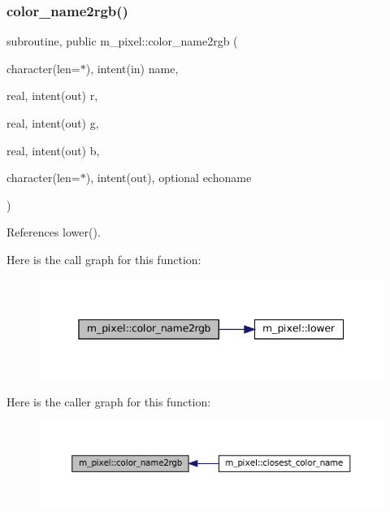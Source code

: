 \subsubsection{\texorpdfstring{color\+\_\+name2rgb()}{color\_name2rgb()}}
{\footnotesize\ttfamily subroutine, public m\+\_\+pixel\+::color\+\_\+name2rgb (\begin{DoxyParamCaption}\item[{character(len=$\ast$), intent(in)}]{name,  }\item[{real, intent(out)}]{r,  }\item[{real, intent(out)}]{g,  }\item[{real, intent(out)}]{b,  }\item[{character(len=$\ast$), intent(out), optional}]{echoname }\end{DoxyParamCaption})}



References lower().

Here is the call graph for this function\+:
\nopagebreak
\begin{figure}[H]
\begin{center}
\leavevmode
\includegraphics[width=345pt]{namespacem__pixel_aee26ac45961d4093d2e472fcb6e1887d_cgraph}
\end{center}
\end{figure}
Here is the caller graph for this function\+:
\nopagebreak
\begin{figure}[H]
\begin{center}
\leavevmode
\includegraphics[width=350pt]{namespacem__pixel_aee26ac45961d4093d2e472fcb6e1887d_icgraph}
\end{center}
\end{figure}
\mbox{\label{namespacem__pixel_a312c40bfbd03b2bbe6f85bc5efca6ce3}} 
